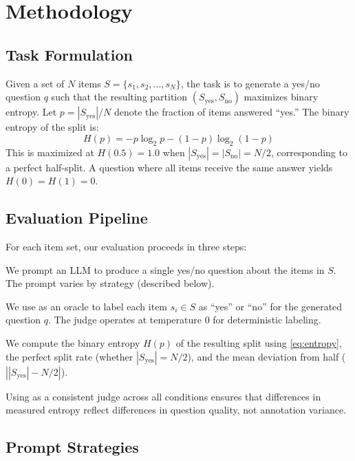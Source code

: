 \section{Methodology}
\label{sec:method}

\subsection{Task Formulation}

Given a set of $N$ items $S = \{s_1, s_2, \ldots, s_N\}$, the task is to generate a yes/no question $q$ such that the resulting partition $(S_{\text{yes}}, S_{\text{no}})$ maximizes binary entropy.
Let $p = |S_{\text{yes}}| / N$ denote the fraction of items answered ``yes.''
The binary entropy of the split is:
\begin{equation}
    H(p) = -p \log_2 p - (1-p) \log_2 (1-p)
    \label{eq:entropy}
\end{equation}
This is maximized at $H(0.5) = 1.0$ when $|S_{\text{yes}}| = |S_{\text{no}}| = N/2$, corresponding to a perfect half-split.
A question where all items receive the same answer yields $H(0) = H(1) = 0$.

\subsection{Evaluation Pipeline}

For each item set, our evaluation proceeds in three steps:

 We prompt an LLM to produce a single yes/no question about the items in $S$.
The prompt varies by strategy (described below).

 We use \gptfull as an oracle to label each item $s_i \in S$ as ``yes'' or ``no'' for the generated question $q$.
The judge operates at temperature 0 for deterministic labeling.

 We compute the binary entropy $H(p)$ of the resulting split using \eqref{eq:entropy}, the perfect split rate (whether $|S_{\text{yes}}| = N/2$), and the mean deviation from half ($|{|S_{\text{yes}}|} - N/2|$).

Using \gptfull as a consistent judge across all conditions ensures that differences in measured entropy reflect differences in question quality, not annotation variance.

\subsection{Prompt Strategies}
\label{sec:prompts}

